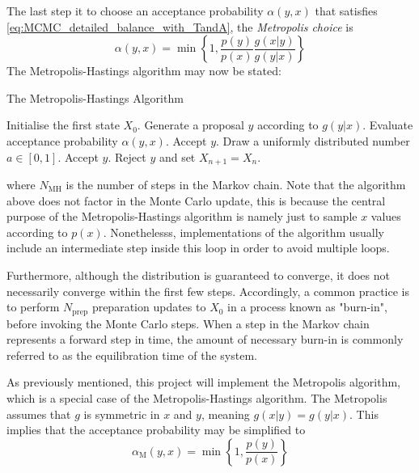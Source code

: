 \documentclass[nofootinbib,reprint,english]{revtex4-1}
\begin{document}
The last step it to choose an acceptance probability \(\alpha(y,x)\) that satisfies \ref{eq:MCMC_detailed_balance_with_TandA}, the \emph{Metropolis choice} is
\begin{equation}\label{eq:Metropolis_Hastings_acceptance_probability}
\alpha(y,x)=\min\left\lbrace 1,\frac{p(y)}{p(x)}\frac{g(x|y)}{g(y|x)}\right\rbrace
\end{equation}
The Metropolis-Hastings algorithm may now be stated:
\begin{algorithm}[H]
\caption{The Metropolis-Hastings Algorithm}\label{algo:Metropolis_Hastings}
\begin{algorithmic}[1]
\State Initialise the first state \(X_0\).
	\State Generate a proposal \(y\) according to \(g(y|x)\).
	\State Evaluate acceptance probability \(\alpha(y,x)\).
		\State Accept \(y\).
	\Else
		\State Draw a uniformly distributed number \(a\in[0,1]\).
			\State Accept \(y\).
		\Else
			\State Reject \(y\) and set \(X_{n+1}=X_n\).
		\EndIf
	\EndIf
\EndFor
\end{algorithmic}
\end{algorithm}
where \(N_\text{MH}\) is the number of steps in the Markov chain. Note that the algorithm above does not factor in the Monte Carlo update, this is because the central purpose of the Metropolis-Hastings algorithm is namely just to sample \(x\) values according to \(p(x)\). Nonethelesss, implementations of the algorithm usually include an intermediate step inside this loop in order to avoid multiple loops.

Furthermore, although the distribution is guaranteed to converge, it does not necessarily converge within the first few steps. Accordingly, a common practice is to perform \(N_\text{prep}\) preparation updates to \(X_0\) in a process known as "burn-in", before invoking the Monte Carlo steps. When a step in the Markov chain represents a forward step in time, the amount of necessary burn-in is commonly referred to as the equilibration time of the system.

As previously mentioned, this project will implement the Metropolis algorithm, which is a special case of the Metropolis-Hastings algorithm. The Metropolis assumes that \(g\) is symmetric in \(x\) and \(y\), meaning \(g(x|y)=g(y|x)\). This implies that the acceptance probability may be simplified to
\begin{equation}\label{eq:Metropolis_acceptance_probability}
\alpha_\text{M}(y,x)=\min\left\lbrace1,\frac{p(y)}{p(x)}\right\rbrace
\end{equation}
\end{document}
